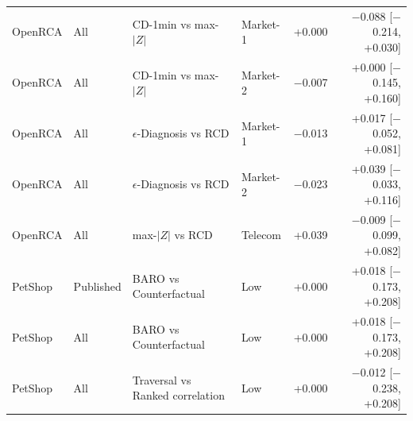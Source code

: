 {\begin{longtable}{llllrr}
OpenRCA & All & CD-1min vs max-$|Z|$ & Market-1 & +0.000 & $-$0.088 [$-$0.214, +0.030] \\
OpenRCA & All & CD-1min vs max-$|Z|$ & Market-2 & $-$0.007 & +0.000 [$-$0.145, +0.160] \\
OpenRCA & All & $\epsilon$-Diagnosis vs RCD & Market-1 & $-$0.013 & +0.017 [$-$0.052, +0.081] \\
OpenRCA & All & $\epsilon$-Diagnosis vs RCD & Market-2 & $-$0.023 & +0.039 [$-$0.033, +0.116] \\
OpenRCA & All & max-$|Z|$ vs RCD & Telecom & +0.039 & $-$0.009 [$-$0.099, +0.082] \\
PetShop & Published & BARO vs Counterfactual & Low & +0.000 & +0.018 [$-$0.173, +0.208] \\
PetShop & All & BARO vs Counterfactual & Low & +0.000 & +0.018 [$-$0.173, +0.208] \\
PetShop & All & Traversal vs Ranked correlation & Low & +0.000 & $-$0.012 [$-$0.238, +0.208] \\
\end{longtable}
}
